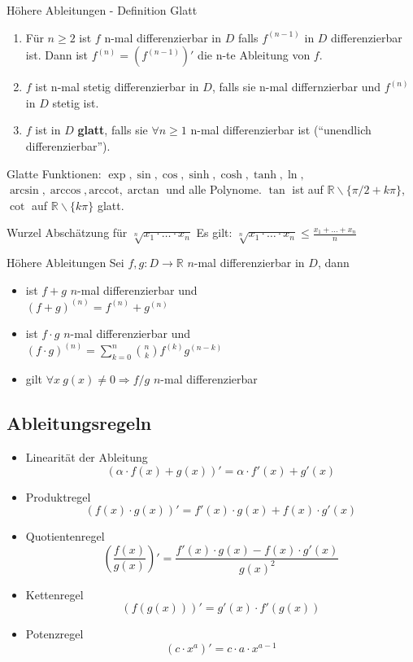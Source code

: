 \documentclass[a4paper,10pt]{article}
\def\R{\mathbb{R}}
\begin{document}
\begin{mainbox}{Höhere Ableitungen - Definition Glatt}
	\begin{enumerate}
		\item Für $n \ge 2$ ist $f$ n-mal differenzierbar in $D$ falls $f^{(n-1)}$ in $D$ differenzierbar ist. Dann ist $f^{(n)} = (f^{(n-1)})'$ die n-te Ableitung von $f$.
		\item $f$ ist n-mal stetig differenzierbar in $D$, falls sie n-mal differnzierbar und $f^{(n)}$ in $D$ stetig ist.
		\item $f$ ist in $D$ \textbf{glatt}, falls sie $\forall n \ge 1$ n-mal differenzierbar ist (``unendlich differenzierbar'').
	\end{enumerate}
\end{mainbox}
Glatte Funktionen: $\exp, \sin, \cos, \sinh, \cosh, \tanh, \ln,$\\ $ \arcsin, \arccos, \text{arccot}, \arctan$ und alle Polynome. $\tan$ ist auf $\R \backslash \{\pi/2 + k\pi\}$, $\cot$ auf $\R \backslash \{k\pi\}$ glatt.

\begin{subbox}{Wurzel Abschätzung für $\sqrt[n]{x_1\cdot \ldots \cdot x_n}$}
	Es gilt: $\displaystyle\sqrt[n]{x_1\cdot \ldots \cdot x_n}\leq\frac{x_1+\dots+x_n}{n}$
\end{subbox}

\begin{subbox}{Höhere Ableitungen}
	Sei $f,g:D\to \mathbb{R}$ $n$-mal differenzierbar in $D$, dann
	\begin{itemize}
		\item ist $f+g$ $n$-mal differenzierbar und \\$(f+g)^{(n)}=f^{(n)}+g^{(n)}$
		\item ist $f\cdot g$ $n$-mal differenzierbar und \\$(f\cdot g)^{(n)}= \sum_{k=0}^{n} \binom{n}{k}f^{(k)}g^{(n-k)}$
		\item gilt $\forall x\ g(x)\neq 0 \Rightarrow f/g$ $n$-mal differenzierbar
	\end{itemize}
\end{subbox}

\vfill\null %

\subsection{Ableitungsregeln}

\begin{itemize}
	\item Linearität der Ableitung
	      $$(\alpha \cdot f(x) + g(x))' = \alpha \cdot f'(x) + g'(x)$$
	\item Produktregel
	      $$(f(x) \cdot g(x))' = f'(x) \cdot g(x) + f(x) \cdot g'(x)$$
	\item Quotientenregel
	      $$\left(\frac{f(x)}{g(x)}\right)' = \frac{f'(x) \cdot g(x) - f(x) \cdot g'(x)}{g(x)^2}$$
	\item Kettenregel
	      $$(f(g(x)))' = g'(x) \cdot f'(g(x))$$
	\item Potenzregel
	      $$(c \cdot x^a)' = c \cdot a \cdot x^{a - 1}$$
\end{itemize}
\end{document}
